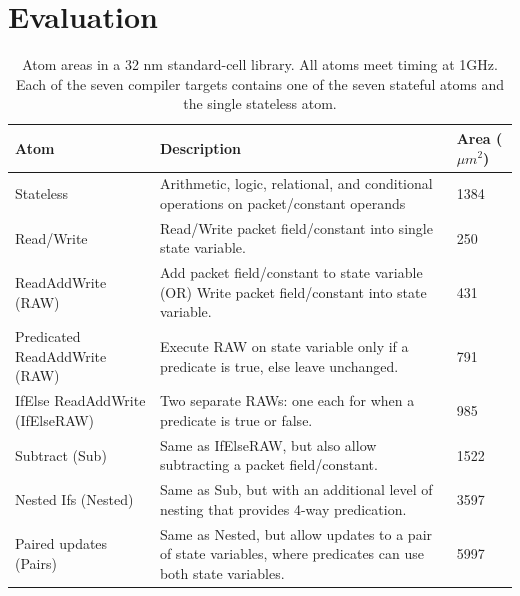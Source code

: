 \section{Evaluation}
\label{s:eval}


\begin{table}[!t]
  \begin{scriptsize}
  \begin{tabular}{|p{}|p{}|p{}|}
    \hline
    Atom & Description & Area ($\mu m^2$)\\
    \hline
    Stateless & Arithmetic, logic, relational, and conditional operations on packet/constant operands & 1384 \\
    \hline
    Read/Write & Read/Write packet field/constant into single state variable. & 250 \\
    \hline
    ReadAddWrite (RAW) & Add packet field/constant to state variable (OR) Write packet field/constant into state variable. & 431 \\
    \hline
    Predicated ReadAddWrite (RAW) & Execute RAW on state variable only if a predicate is true, else leave unchanged. & 791 \\
    \hline
    IfElse ReadAddWrite (IfElseRAW) & Two separate RAWs: one each for when a predicate is true or false. & 985 \\
    \hline
    Subtract (Sub) & Same as IfElseRAW, but also allow subtracting a packet field/constant. & 1522 \\
    \hline
    Nested Ifs (Nested) & Same as Sub, but with an additional level of nesting that provides 4-way predication. & 3597 \\
    \hline
    Paired updates (Pairs) & Same as Nested, but allow updates to a pair of state variables, where predicates can use both state variables. & 5997 \\
    \hline
  \end{tabular}
  \end{scriptsize}
  \caption{Atom areas in a 32 nm standard-cell library.  All atoms
  meet timing at 1GHz. Each of the seven compiler targets contains one of the
  seven stateful atoms and the single stateless atom.}
  \label{tab:templates}
\end{table}

